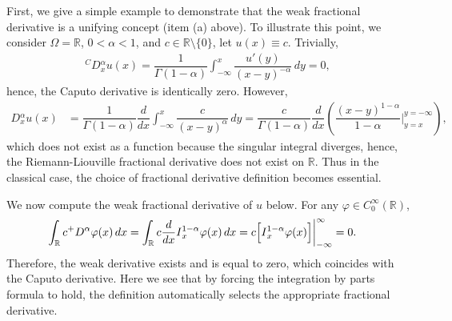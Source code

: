 \documentclass[leqno,final]{siamltex}
\numberwithin{equation}{section}
\renewcommand{\(}{\bigl(}
\renewcommand{\)}{\bigr)}
\newcommand{\R}{\mathbb{R}}
\begin{document}
    First, we give a simple example to demonstrate that the weak fractional derivative is a unifying concept (item (a) above). To illustrate this point, we consider 
    $\Omega = \R$, $0 < \alpha <1$, and $c \in \R \setminus\{0\}$, let $u(x) \equiv c$. Trivially, 
    \begin{align*}
    {^{C}}{D}{^{\alpha}_{x}} u(x) = \dfrac{1}{\Gamma(1-\alpha)} \int_{-\infty}^{x} \dfrac{u'(y)}{ (x-y)^{-\alpha}}\,dy  
    =  0, 
    \end{align*}
    hence, the Caputo derivative is identically zero.  However,  
    \begin{align*}
    {}{D}{^{\alpha}_{x}} u(x) &= \dfrac{1}{\Gamma(1-\alpha)} \dfrac{d}{dx}\int_{-\infty}^{x} \dfrac{c}{(x-y)^{\alpha}} \,dy = \dfrac{c}{\Gamma(1-\alpha)}\dfrac{d}{dx} \left( \dfrac{(x-y)^{1-\alpha}}{1-\alpha} \bigg|_{y=x}^{y=-\infty} \right),
    \end{align*}
    which does not exist as a function because the singular integral diverges, hence, 
    the Riemann-Liouville fractional derivative does not exist on $\R$. Thus in the classical case, the choice of fractional derivative definition becomes essential. 
    
   We now compute the weak fractional derivative of $u$ below. For any $\varphi \in C^{\infty}_{0}(\R)$,
    \begin{align*}
        \int_{\R} c {^{+}}{D}{^{\alpha}} \varphi(x)\,dx &= \int_{\R} c \dfrac{d}{dx} {}{I}{^{1-\alpha}_{x}} \varphi(x) \,dx
        = c \Bigl[ {}{I}{^{1-\alpha}_{x}} \varphi(x) \Bigr] \bigg|_{-\infty}^{\infty} = 0.
    \end{align*}
    Therefore, the weak derivative exists and is equal to zero, which coincides 
    with the Caputo derivative. Here we see that by forcing the integration by parts 
    formula to hold, the definition automatically selects the appropriate fractional derivative.
    
\end{document}
